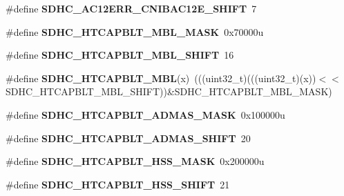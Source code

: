 \begin{DoxyCompactItemize}
\item 
\#define {\bfseries S\+D\+H\+C\+\_\+\+A\+C12\+E\+R\+R\+\_\+\+C\+N\+I\+B\+A\+C12\+E\+\_\+\+S\+H\+I\+FT}~7\hypertarget{group__SDHC__Register__Masks_gaa5735a7d405c4f7841b2f62c9a3cc841}{}\label{group__SDHC__Register__Masks_gaa5735a7d405c4f7841b2f62c9a3cc841}

\item 
\#define {\bfseries S\+D\+H\+C\+\_\+\+H\+T\+C\+A\+P\+B\+L\+T\+\_\+\+M\+B\+L\+\_\+\+M\+A\+SK}~0x70000u\hypertarget{group__SDHC__Register__Masks_gae49b97c8816777f7f7b5148f2b8ae5c1}{}\label{group__SDHC__Register__Masks_gae49b97c8816777f7f7b5148f2b8ae5c1}

\item 
\#define {\bfseries S\+D\+H\+C\+\_\+\+H\+T\+C\+A\+P\+B\+L\+T\+\_\+\+M\+B\+L\+\_\+\+S\+H\+I\+FT}~16\hypertarget{group__SDHC__Register__Masks_gac68ea213ff8629145f7ad40c9525cffe}{}\label{group__SDHC__Register__Masks_gac68ea213ff8629145f7ad40c9525cffe}

\item 
\#define {\bfseries S\+D\+H\+C\+\_\+\+H\+T\+C\+A\+P\+B\+L\+T\+\_\+\+M\+BL}(x)~(((uint32\+\_\+t)(((uint32\+\_\+t)(x))$<$$<$S\+D\+H\+C\+\_\+\+H\+T\+C\+A\+P\+B\+L\+T\+\_\+\+M\+B\+L\+\_\+\+S\+H\+I\+FT))\&S\+D\+H\+C\+\_\+\+H\+T\+C\+A\+P\+B\+L\+T\+\_\+\+M\+B\+L\+\_\+\+M\+A\+SK)\hypertarget{group__SDHC__Register__Masks_ga10ae4a906c4f6c75b8a4f87b1401114d}{}\label{group__SDHC__Register__Masks_ga10ae4a906c4f6c75b8a4f87b1401114d}

\item 
\#define {\bfseries S\+D\+H\+C\+\_\+\+H\+T\+C\+A\+P\+B\+L\+T\+\_\+\+A\+D\+M\+A\+S\+\_\+\+M\+A\+SK}~0x100000u\hypertarget{group__SDHC__Register__Masks_gadb87583a1db8c53c61fdac8604e1ecc5}{}\label{group__SDHC__Register__Masks_gadb87583a1db8c53c61fdac8604e1ecc5}

\item 
\#define {\bfseries S\+D\+H\+C\+\_\+\+H\+T\+C\+A\+P\+B\+L\+T\+\_\+\+A\+D\+M\+A\+S\+\_\+\+S\+H\+I\+FT}~20\hypertarget{group__SDHC__Register__Masks_ga6ceeb752d9ccad530b178fef829a9db6}{}\label{group__SDHC__Register__Masks_ga6ceeb752d9ccad530b178fef829a9db6}

\item 
\#define {\bfseries S\+D\+H\+C\+\_\+\+H\+T\+C\+A\+P\+B\+L\+T\+\_\+\+H\+S\+S\+\_\+\+M\+A\+SK}~0x200000u\hypertarget{group__SDHC__Register__Masks_gabe87f7e9a2aa3b99012eaae8321aed89}{}\label{group__SDHC__Register__Masks_gabe87f7e9a2aa3b99012eaae8321aed89}

\item 
\#define {\bfseries S\+D\+H\+C\+\_\+\+H\+T\+C\+A\+P\+B\+L\+T\+\_\+\+H\+S\+S\+\_\+\+S\+H\+I\+FT}~21\hypertarget{group__SDHC__Register__Masks_gae24b3d89ddf5bf4bf48ccc6fa948891d}{}\label{group__SDHC__Register__Masks_gae24b3d89ddf5bf4bf48ccc6fa948891d}


\end{DoxyCompactItemize}
